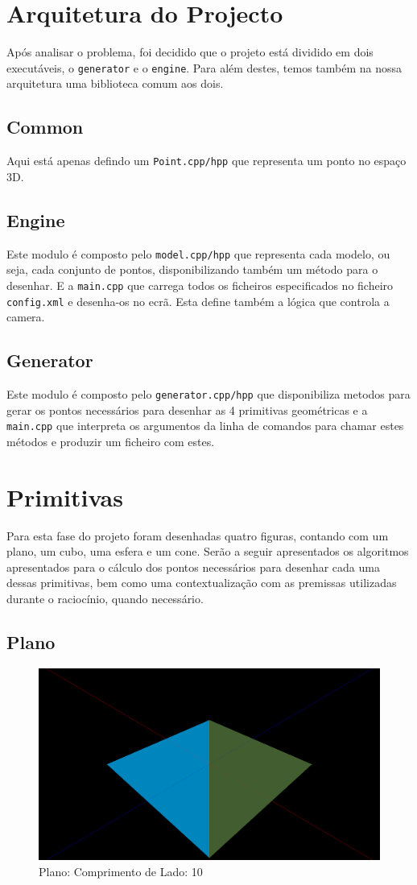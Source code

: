 \documentclass[a4paper]{article}
\begin{document}
\section{Arquitetura do Projecto}
Após analisar o problema, foi decidido que o projeto está dividido em dois executáveis, o \texttt{generator} e o \texttt{engine}. Para além destes, temos também na nossa arquitetura uma biblioteca comum aos dois.

\subsection{Common}

Aqui está apenas defindo um \texttt{Point.cpp/hpp} que representa um ponto no espaço 3D.

\subsection{Engine}

Este modulo é composto pelo \texttt{model.cpp/hpp} que representa cada modelo, ou seja, cada conjunto de pontos, disponibilizando também um método para o desenhar. E a \texttt{main.cpp} que carrega todos os ficheiros especificados no ficheiro \texttt{config.xml} e desenha-os no ecrã. Esta define também a lógica que controla a camera.

\subsection{Generator}

Este modulo é composto pelo \texttt{generator.cpp/hpp} que disponibiliza metodos para gerar os pontos necessários para desenhar as 4 primitivas geométricas e a \texttt{main.cpp} que interpreta os argumentos da linha de comandos para chamar estes métodos e produzir um ficheiro com estes.

\section{Primitivas}
 Para esta fase do projeto foram desenhadas quatro figuras, contando com um plano, um cubo, uma esfera e um cone. Serão a seguir apresentados os algoritmos apresentados para o cálculo dos pontos necessários para desenhar cada uma dessas primitivas, bem como uma contextualização com as premissas utilizadas durante o raciocínio, quando necessário.
\subsection{Plano}
\begin{figure}[H]
\centering
\includegraphics[width=0.5\linewidth]{plane.png}
\caption{Plano: Comprimento de Lado: 10}
\end{figure}
\end{document}
